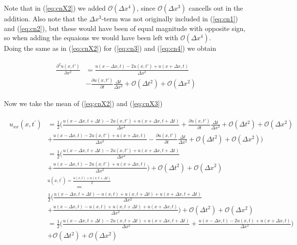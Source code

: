 \documentclass{article}
\begin{document}
Note that in (\ref{eq:cnX2}) we added $\mathcal{O}(\Delta x^4)$, since  $\mathcal{O}(\Delta x^3)$ cancells out in the addition. Also note that the $\Delta x^3$-term was not originally  included in (\ref{eq:cn1}) and  (\ref{eq:cn2}), but these would have been of equal magnitude with opposite sign, so when adding the equaions we would have been left with $\mathcal{O}(\Delta x^4)$.\\

Doing the same as in (\ref{eq:cnX2}) for (\ref{eq:cn3}) and (\ref{eq:cn4}) we obtain

\begin{subequations}\label{eq:cnX3}
	\begin{align}
		\begin{split}
			\frac{\partial^2 u(x,t')}{\partial x^2} &=\frac{u(x-\Delta x,t) - 2u(x,t') + u(x+\Delta x, t)}{\Delta x^2}\\
			&- \frac{\partial u(x,t')}{\partial t} \frac{\Delta t}{\Delta x^2} 
			+  \mathcal{O}(\Delta t^2) + \mathcal{O}(\Delta x^2)
		\end{split}
	\end{align}
\end{subequations}

Now we take the mean of (\ref{eq:cnX2}) and (\ref{eq:cnX3}) 

\begin{subequations}
	\begin{align}
		\begin{split}
			u_{xx}(x, t^{'}) &=\frac{1}{2} \Big(\frac{u(x-\Delta x,t+ \Delta t)  - 2u(x,t') +  	u(x+\Delta x, t+\Delta t)}{\Delta x^2} +\frac{\partial u(x,t')}{\partial t} \frac{\Delta t}{\Delta x^2} + \mathcal{O}(\Delta t^2) + \mathcal{O}(\Delta x^2) \\
			&+  \frac{u(x-\Delta x,t) - 2u(x,t') + u(x+\Delta x, t)}{\Delta x^2} -\frac{\partial u(x,t')}{\partial t} \frac{\Delta t}{\Delta x^2} + \mathcal{O}(\Delta t^2)  + \mathcal{O}(\Delta x^2)\Big)\\
			&= \frac{1}{2} \Big(\frac{u(x-\Delta x,t+ \Delta t)  - 2u(x,t') +  	u(x+\Delta x, t+\Delta t)}{\Delta x^2} \\
			& +  \frac{u(x-\Delta x,t) - 2u(x,t') + u(x+\Delta x, t)}{\Delta x^2} \Big) + \mathcal{O}(\Delta t^2) + \mathcal{O}(\Delta x^2)\\
			&\stackrel{u(x,t^{'}) = \frac{u(x,t) + u(x,t+\Delta t)}{2}}{=}\\
			&\frac{1}{2} \Big(\frac{u(x-\Delta x,t+ \Delta t)  - u(x,t) + u(x,t+\Delta t) +  	u(x+\Delta x, t+\Delta t)}{\Delta x^2} \\
			& +  \frac{u(x-\Delta x,t) - u(x,t) + u(x,t+\Delta t) + u(x+\Delta x, t)}{\Delta x^2} \Big) + \mathcal{O}(\Delta t^2) + \mathcal{O}(\Delta x^2)\\
			&= \frac{1}{2} \Big(\frac{u(x-\Delta x,t+ \Delta t) - 2u(x,t+\Delta t) +u(x + \Delta x,t+\Delta t)}{\Delta x^2} + \frac{u(x-\Delta x,t) - 2u(x,t) +u(x+ \Delta x,t)}{\Delta x^2} \Big)\\
			& + \mathcal{O}(\Delta t^2)  + \mathcal{O}(\Delta x^2)\label{eq:cnX4}
			\end{split}
	\end{align}
\end{subequations}
\end{document}
